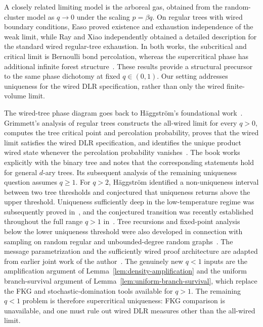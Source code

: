 \documentclass[11pt]{amsart}
\theoremstyle{plain}
\theoremstyle{definition}
\theoremstyle{remark}
\begin{document}
A closely related limiting model is the arboreal gas, obtained from the random-cluster model as $q\to0$ under the scaling $p=\beta q$. On regular trees with wired boundary conditions, Easo proved existence and exhaustion independence of the weak limit, while Ray and Xiao independently obtained a detailed description for the standard wired regular-tree exhaustion. In both works, the subcritical and critical limit is Bernoulli bond percolation, whereas the supercritical phase has additional infinite forest structure~\cite{easo2022wired,rayXiao2022forests}. These results provide a structural precursor to the same phase dichotomy at fixed $q\in(0,1)$. Our setting addresses uniqueness for the wired DLR specification, rather than only the wired finite-volume limit.

The wired-tree phase diagram goes back to H{\"a}ggstr{\"o}m's foundational work~\cite{haggstrom1996homogeneous}. Grimmett's analysis of regular trees constructs the all-wired limit for every $q>0$, computes the tree critical point and percolation probability, proves that the wired limit satisfies the wired DLR specification, and identifies the unique product wired state whenever the percolation probability vanishes~\cite{grimmett2006randomcluster}. The book works explicitly with the binary tree and notes that the corresponding statements hold for general $d$-ary trees. Its subsequent analysis of the remaining uniqueness question assumes $q\ge1$. For $q>2$, H{\"a}ggstr{\"o}m identified a non-uniqueness interval between two tree thresholds and conjectured that uniqueness returns above the upper threshold. Uniqueness sufficiently deep in the low-temperature regime was subsequently proved in~\cite{grimmettJanson2005branching,jonasson1999general}, and the conjectured transition was recently established throughout the full range $q>1$ in~\cite{blanca2026uniqueness}. Tree recursions and fixed-point analysis below the lower uniqueness threshold were also developed in connection with sampling on random regular and unbounded-degree random graphs~\cite{blancaEtAl2020sampling,blanca2023sampling}. The message parametrization and the sufficiently wired proof architecture are adapted from earlier joint work of the author~\cite{blanca2026uniqueness}. The genuinely new $q<1$ inputs are the amplification argument of Lemma~\ref{lem:density-amplification} and the uniform branch-survival argument of Lemma~\ref{lem:uniform-branch-survival}, which replace the FKG and stochastic-domination tools available for $q>1$. The remaining $q<1$ problem is therefore supercritical uniqueness: FKG comparison is unavailable, and one must rule out wired DLR measures other than the all-wired limit.
\end{document}
